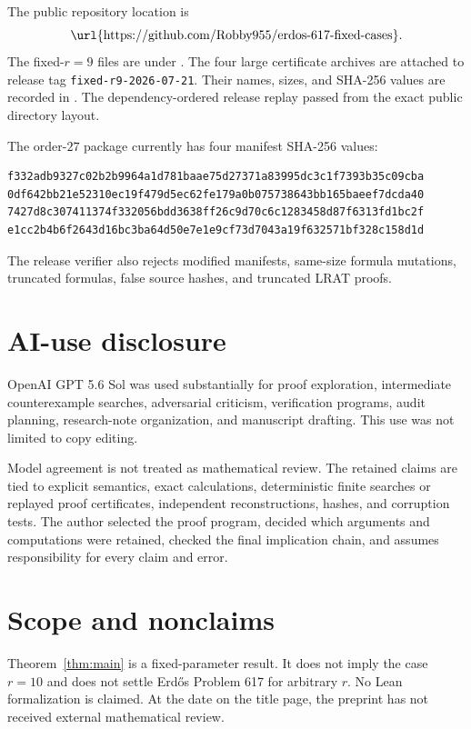\documentclass[11pt,reqno,a4paper]{amsart}
\theoremstyle{definition}
\theoremstyle{remark}
\begin{document}
The public repository location is
\[
 \text{\url{https://github.com/Robby955/erdos-617-fixed-cases}}.
\]
The fixed-$r=9$ files are under . The four large certificate
archives are attached to release tag
\texttt{fixed-r9-2026-07-21}. Their names, sizes, and SHA-256 values are
recorded in . The dependency-ordered release
replay passed from the exact public directory layout.

The order-$27$ package currently has four manifest SHA-256 values:
\begingroup
\scriptsize
\begin{verbatim}
f332adb9327c02b2b9964a1d781baae75d27371a83995dc3c1f7393b35c09cba
0df642bb21e52310ec19f479d5ec62fe179a0b075738643bb165baeef7dcda40
7427d8c307411374f332056bdd3638ff26c9d70c6c1283458d87f6313fd1bc2f
e1cc2b4b6f2643d16bc3ba64d50e7e1e9cf73d7043a19f632571bf328c158d1d
\end{verbatim}
\endgroup
The release verifier also rejects modified manifests, same-size formula
mutations, truncated formulas, false source hashes, and truncated LRAT
proofs.

\section{AI-use disclosure}\label{sec:ai}

OpenAI GPT 5.6 Sol was used substantially for proof exploration,
intermediate counterexample searches, adversarial criticism, verification
programs, audit planning, research-note organization, and manuscript
drafting. This use was not limited to copy editing.

Model agreement is not treated as mathematical review. The retained claims
are tied to explicit semantics, exact calculations, deterministic finite
searches or replayed proof certificates, independent reconstructions,
hashes, and corruption tests. The author selected the proof program,
decided which arguments and computations were retained, checked the final
implication chain, and assumes responsibility for every claim and error.

\section{Scope and nonclaims}\label{sec:nonclaims}

Theorem~\ref{thm:main} is a fixed-parameter result. It does not imply the
case $r=10$ and does not settle Erd\H{o}s Problem 617 for arbitrary $r$.
No Lean formalization is claimed. At the date on the title page, the
preprint has not received external mathematical review.
\end{document}
